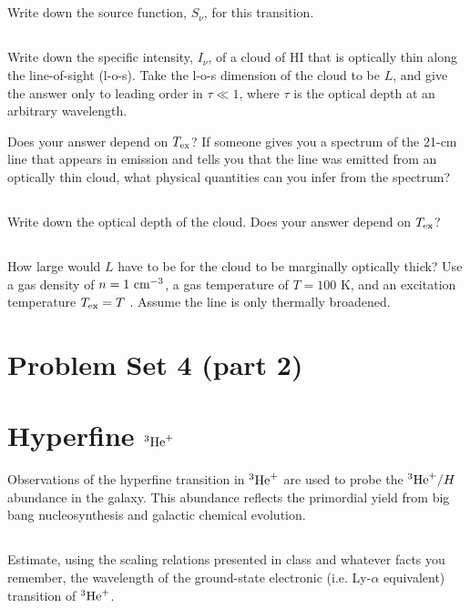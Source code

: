 \documentclass[11pt]{article}
\begin{document}
\subsection{}
Write down the source function, $S_\nu$, for this transition.

\subsection{}
Write down the specific intensity, $I_\nu$, of a cloud of HI that is optically
thin along the line-of-sight (l-o-s). Take the l-o-s dimension of the cloud to
be $L$, and give the answer only to leading order in $\tau\ll1$, where $\tau$ is the
optical depth at an arbitrary wavelength.

Does your answer depend on ${T_{\rm ex}}$?  If someone gives you a spectrum of the 21-cm
line that appears in emission and tells you that the line was emitted from an
optically thin cloud, what physical quantities can you infer from the spectrum?

\subsection{}
Write down the optical depth of the cloud. Does your answer depend on ${T_{\rm ex}}$?

\subsection{}
How large would $L$ have to be for the cloud to be marginally optically
thick? Use a gas density of $n=1~{\rm cm}^{-3}$, a gas temperature of $T = 100$ K, and an
excitation temperature ${T_{\rm ex}} = T$ . Assume the line is only thermally broadened.

\def\He{{^3{\rm He}^+}}
\section*{\centering Problem Set 4 (part 2)}

\section{Hyperfine $\He$}
Observations of the hyperfine transition in $\He$ are used to probe the $\He/H$ abundance
in the galaxy.  This abundance reflects the primordial yield from big bang nucleosynthesis
and galactic chemical evolution.

\subsection{}
Estimate, using the scaling relations presented in class and whatever facts you
remember, the wavelength of the ground-state electronic (i.e. Ly-$\alpha$ equivalent) transition of $\He$.
\end{document}
